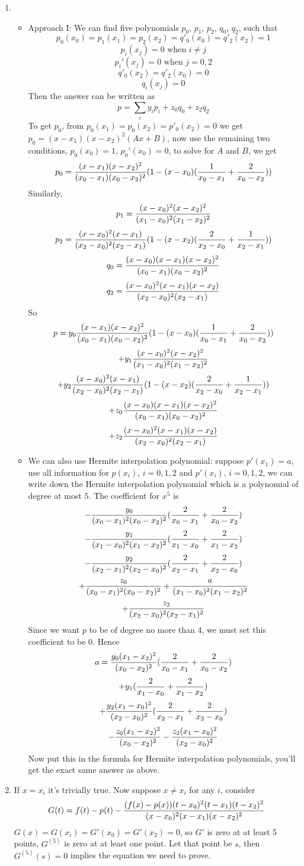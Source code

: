 \documentclass[20pt]{article} %
\theoremstyle{break}
\begin{document}
\begin{enumerate}
\item \begin{itemize}
  \item Approach I: We can find five polynomials $p_0$, $p_1$, $p_2$, $q_0$, $q_2$, such that
    \[p_0(x_0)=p_1(x_1)=p_2(x_2)=q'_0(x_0)=q'_2(x_2)=1\]
    \[p_i(x_j)=0\text{ when }i\not=j\]
    \[p_i'(x_j)=0\text{ when }j=0, 2\]
    \[q'_0(x_2)=q'_2(x_0)=0\]
    \[q_i(x_j)=0\]
    Then the answer can be written as
    \[p=\sum_iy_ip_i+z_0q_0+z_2q_2\]
    To get $p_0$, from $p_0(x_1)=p_0(x_2)=p'_0(x_2)=0$ we get $p_0=(x-x_1)(x-x_2)^2(Ax+B)$, now use the remaining two conditions, $p_0(x_0)=1$, $p_0'(x_0)=0$, to solve for $A$ and $B$, we get
    \[p_0={(x-x_1)(x-x_2)^2\over (x_0-x_1)(x_0-x_2)^2}(1-(x-x_0)({1\over x_0-x_1}+{2\over x_0-x_2}))\]
    Similarly,
    \[p_1={(x-x_0)^2(x-x_2)^2\over (x_1-x_0)^2(x_1-x_2)^2}\]
    \[p_2={(x-x_0)^2(x-x_1)\over (x_2-x_0)^2(x_2-x_1)}(1-(x-x_2)({2\over x_2-x_0}+{1\over x_2-x_1}))\]
    \[q_0={(x-x_0)(x-x_1)(x-x_2)^2\over (x_0-x_1)(x_0-x_2)^2}\]
    \[q_2={(x-x_0)^2(x-x_1)(x-x_2)\over (x_2-x_0)^2(x_2-x_1)}\]
    So
    \[p=y_0{(x-x_1)(x-x_2)^2\over (x_0-x_1)(x_0-x_2)^2}(1-(x-x_0)({1\over x_0-x_1}+{2\over x_0-x_2}))\]
    \[+y_1{(x-x_0)^2(x-x_2)^2\over (x_1-x_0)^2(x_1-x_2)^2}\]
    \[+y_2{(x-x_0)^2(x-x_1)\over (x_2-x_0)^2(x_2-x_1)}(1-(x-x_2)({2\over x_2-x_0}+{1\over x_2-x_1}))\]
    \[+z_0{(x-x_0)(x-x_1)(x-x_2)^2\over (x_0-x_1)(x_0-x_2)^2}\]
    \[+z_2{(x-x_0)^2(x-x_1)(x-x_2)\over (x_2-x_0)^2(x_2-x_1)}\]
  \item We can also use Hermite interpolation polynomial: suppose $p'(x_1)=a$, use all information for $p(x_i)$, $i=0, 1, 2$ and $p'(x_i)$, $i=0, 1, 2$, we can write down the Hermite interpolation polynomial which is a polynomial of degree at most $5$. The coefficient for $x^5$ is
    \[-{y_0\over (x_0-x_1)^2(x_0-x_2)^2}({2\over x_0-x_1}+{2\over x_0-x_2})\]
    \[-{y_1\over (x_1-x_0)^2(x_1-x_2)^2}({2\over x_1-x_0}+{2\over x_1-x_2})\]
    \[-{y_2\over (x_2-x_1)^2(x_2-x_0)^2}({2\over x_2-x_1}+{2\over x_2-x_0})\]
    \[+{z_0\over (x_0-x_1)^2(x_0-x_2)^2}+{a\over (x_1-x_0)^2(x_1-x_2)^2}\]
    \[+{z_2\over (x_2-x_0)^2(x_2-x_1)^2}\]
    Since we want $p$ to be of degree no more than $4$, we must set this coefficient to be $0$. Hence
    \[a={y_0(x_1-x_2)^2\over (x_0-x_2)^2}({2\over x_0-x_1}+{2\over x_0-x_2})\]
      \[+y_1({2\over x_1-x_0}+{2\over x_1-x_2})\]
      \[+{y_2(x_1-x_0)^2\over (x_2-x_0)^2}({2\over x_2-x_1}+{2\over x_2-x_0})\]
      \[-{z_0(x_1-x_2)^2\over (x_0-x_2)^2}-{z_2(x_1-x_0)^2\over (x_2-x_0)^2}\]
      Now put this in the formula for Hermite interpolation polynomials, you'll get the exact same answer as above.
 \end{itemize}

    \item If $x=x_i$ it's trivially true. Now suppose $x\not=x_i$ for any $i$, consider
      \[G(t)=f(t)-p(t)-{(f(x)-p(x))(t-x_0)^2(t-x_1)(t-x_2)^2\over (x-x_0)^2(x-x_1)(x-x_2)^2}\]
      $G(x)=G(x_i)=G'(x_0)=G'(x_2)=0$, so $G'$ is zero at at least 5 points, $G^{(5)}$ is zero at at least one point. Let that point be $s$, then $G^{(5)}(s)=0$ implies the equation we need to prove.
\end{enumerate}
\end{document}
